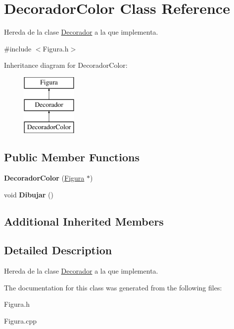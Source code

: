 \hypertarget{class_decorador_color}{\section{Decorador\-Color Class Reference}
\label{class_decorador_color}
}


Hereda de la clase \hyperlink{class_decorador}{Decorador} a la que implementa.  




{\ttfamily \#include $<$Figura.\-h$>$}

Inheritance diagram for Decorador\-Color\-:\begin{figure}[H]
\begin{center}
\leavevmode
\includegraphics[height=3.000000cm]{class_decorador_color}
\end{center}
\end{figure}
\subsection*{Public Member Functions}
\begin{DoxyCompactItemize}
\item 
\hypertarget{class_decorador_color_a450c44f5a5f8ecd127405670be9b5453}{{\bfseries Decorador\-Color} (\hyperlink{class_figura}{Figura} $\ast$)}\label{class_decorador_color_a450c44f5a5f8ecd127405670be9b5453}

\item 
\hypertarget{class_decorador_color_a043e0d9279f6e9dd867972ab6c0e8a59}{void {\bfseries Dibujar} ()}\label{class_decorador_color_a043e0d9279f6e9dd867972ab6c0e8a59}

\end{DoxyCompactItemize}
\subsection*{Additional Inherited Members}


\subsection{Detailed Description}
Hereda de la clase \hyperlink{class_decorador}{Decorador} a la que implementa. 

The documentation for this class was generated from the following files\-:\begin{DoxyCompactItemize}
\item 
Figura.\-h\item 
Figura.\-cpp\end{DoxyCompactItemize}
